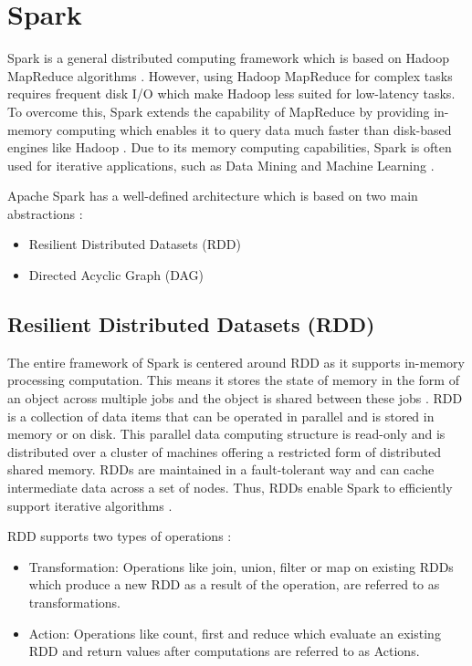 \documentclass[sigconf]{acmart}
\begin{document}
\section{Spark}

Spark is a general distributed computing framework which is based on Hadoop MapReduce algorithms \cite{fu2016spark-p1}. However, using Hadoop MapReduce for complex tasks requires frequent disk I/O which make Hadoop less suited for low-latency tasks. To overcome this, Spark extends the capability of MapReduce by providing in-memory computing which enables it to query data much faster than disk-based engines like Hadoop \cite{spark-j1}. Due to its memory computing capabilities, Spark is often used for iterative applications, such as Data Mining and Machine Learning \cite{fu2016spark-p1}. 

Apache Spark has a well-defined architecture which is based on two main abstractions \cite{spark-a2}:
\begin{itemize}
	\item Resilient Distributed Datasets (RDD)
	\item Directed Acyclic Graph (DAG)
\end{itemize}

\subsection{Resilient Distributed Datasets (RDD)} 
The entire framework of Spark is centered around RDD as it supports in-memory processing computation. This means it stores the state of memory in the form of an object across multiple jobs and the object is shared between these jobs \cite{spark-j2}. RDD is a collection of data items that can be operated in parallel and is stored in memory or on disk. This parallel data computing structure is read-only and is distributed over a cluster of machines offering a restricted form of distributed shared memory. RDDs are maintained in a fault-tolerant way and can cache intermediate data across a set of nodes. Thus, RDDs enable Spark to efficiently support iterative algorithms \cite{marcu2016spark-p2}.

RDD supports two types of operations \cite{spark-a3}:
\begin{itemize}
	\item Transformation: Operations like join, union, filter or map on existing RDDs which produce a new RDD as a result of the operation, are referred to as transformations.
	\item Action: Operations like count, first and reduce which evaluate an existing RDD and return values after computations are referred to as Actions.
\end{itemize}
\end{document}
